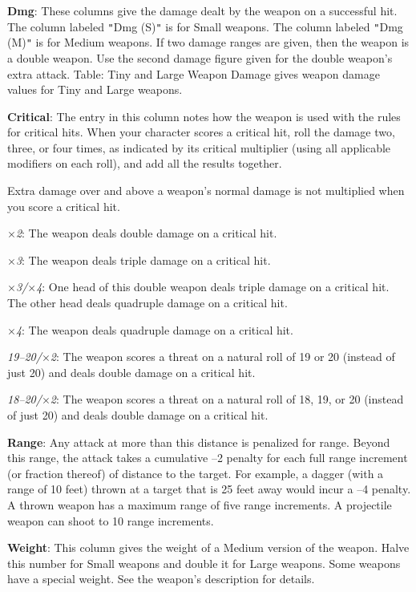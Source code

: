 \textbf{Dmg}: These columns give the damage dealt by the weapon on a successful hit. The column labeled \texttt{{}"{}}Dmg (S)\texttt{{}"{}} is for Small weapons. The column labeled \texttt{{}"{}}Dmg (M)\texttt{{}"{}} is for Medium weapons. If two damage ranges are given, then the weapon is a double weapon. Use the second damage figure given for the double weapon's extra attack. Table: Tiny and Large Weapon Damage gives weapon damage values for Tiny and Large weapons.
		
\textbf{Critical}: The entry in this column notes how the weapon is used with the rules for critical hits. When your character scores a critical hit, roll the damage two, three, or four times, as indicated by its critical multiplier (using all applicable modifiers on each roll), and add all the results together.
		
Extra damage over and above a weapon's normal damage is not multiplied when you score a critical hit.
		
\mbox{$\times$}\textit{2}: The weapon deals double damage on a critical hit.
		
\mbox{$\times$}\textit{3}: The weapon deals triple damage on a critical hit.
		
\mbox{$\times$}\textit{3/}\mbox{$\times$}\textit{4}: One head of this double weapon deals triple damage on a critical hit. The other head deals quadruple damage on a critical hit.
		
\mbox{$\times$}\textit{4}: The weapon deals quadruple damage on a critical hit.
		
\textit{19--20/}\mbox{$\times$}\textit{2}: The weapon scores a threat on a natural roll of 19 or 20 (instead of just 20) and deals double damage on a critical hit. 
		
\textit{18--20/}\mbox{$\times$}\textit{2}: The weapon scores a threat on a natural roll of 18, 19, or 20 (instead of just 20) and deals double damage on a critical hit. 
		
\textbf{Range}: Any attack at more than this distance is penalized for range. Beyond this range, the attack takes a cumulative --2 penalty for each full range increment (or fraction thereof) of distance to the target. For example, a dagger (with a range of 10 feet) thrown at a target that is 25 feet away would incur a --4 penalty. A thrown weapon has a maximum range of five range increments. A projectile weapon can shoot to 10 range increments.
		
\textbf{Weight}: This column gives the weight of a Medium version of the weapon. Halve this number for Small weapons and double it for Large weapons. Some weapons have a special weight. See the weapon's description for details.
		

